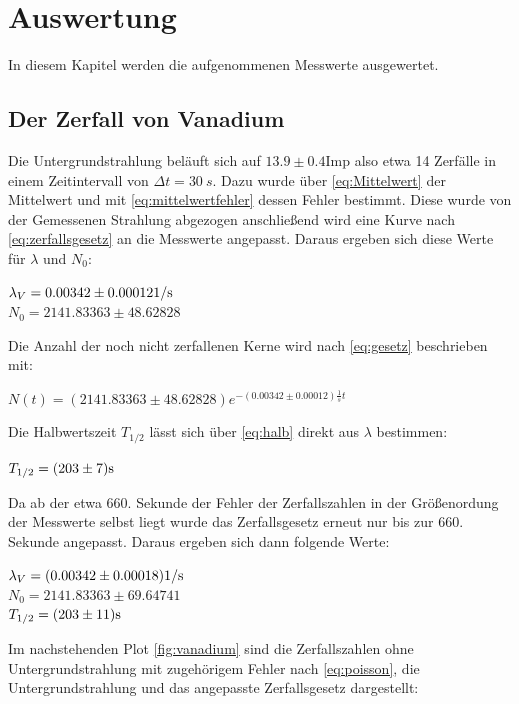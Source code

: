 \section{Auswertung}
\label{sec:auswertung}
In diesem Kapitel werden die aufgenommenen Messwerte ausgewertet.
\subsection{Der Zerfall von Vanadium}
\label{sec:vanadium}
Die Untergrundstrahlung beläuft sich auf  $13.9 \pm 0.4 \mathrm{Imp}$ also etwa 14 Zerfälle in einem Zeitintervall
von $\Delta t =\SI{30}{s}$. Dazu wurde über \autoref{eq:Mittelwert} der Mittelwert und mit \autoref{eq:mittelwertfehler} dessen Fehler bestimmt.
Diese wurde von der Gemessenen Strahlung abgezogen anschließend wird
eine Kurve nach \autoref{eq:zerfallsgesetz} an die Messwerte angepasst. Daraus ergeben sich diese Werte für $\lambda$ und 
$N_0$:
\begin{center}
    $ \lambda_V =0.00342\pm 0.00012\si[]{1/s}$\\
    $N_0=2141.83363\pm48.62828$
\end{center}
Die Anzahl der noch nicht zerfallenen Kerne wird nach \autoref{eq:gesetz} beschrieben mit:
\begin{center}
    $N(t)=(2141.83363\pm48.62828) e^{-(0.00342\pm0.00012)\frac{1}{s}t}$
\end{center}
Die Halbwertszeit $T_{1/2}$ lässt sich über \autoref{eq:halb} direkt aus $\lambda$ bestimmen:
\begin{center}
  $T_{1/2}=(203\pm 7)\si[]{s}$
\end{center}
Da ab der etwa 660. Sekunde der Fehler der Zerfallszahlen in der Größenordung der Messwerte selbst liegt
wurde das Zerfallsgesetz erneut nur bis zur 660. Sekunde angepasst. Daraus ergeben sich dann folgende Werte:
\begin{center}
  $ \lambda_V =(0.00342\pm 0.00018)\si[]{1/s}$\\
  $N_0=2141.83363\pm 69.64741$\\
  $T_{1/2}=(203 \pm 11)\si[]{s}$
\end{center}
Im nachstehenden Plot \autoref{fig:vanadium} sind die Zerfallszahlen ohne Untergrundstrahlung mit zugehörigem 
Fehler nach \autoref{eq:poisson}, die Untergrundstrahlung und das angepasste Zerfallsgesetz dargestellt:
